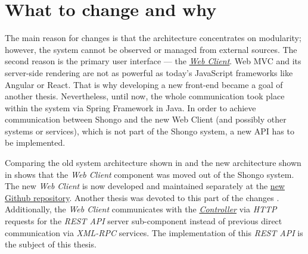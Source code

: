 \chapter{What to change and why}

The main reason for changes is that the architecture concentrates on modularity; however, the system cannot be observed or managed from external sources.
The second reason is the primary user interface --- the \hyperref[webclient]{\emph{Web Client}}. Web MVC and its server-side rendering are not as powerful as today's JavaScript frameworks like Angular or React.
That is why developing a new front-end became a goal of another thesis. \cite{drobnakm}
Nevertheless, until now, the whole communication took place within the system via Spring Framework in Java. In order to achieve communication between Shongo and the new Web Client (and possibly other systems or services), which is not part of the Shongo system, a new API has to be implemented.


Comparing the old system architecture shown in  and the new architecture shown in  shows that the \emph{Web Client} component was moved out of the Shongo system. The new \emph{Web Client} is now developed and maintained separately at the \href{https://github.com/shongo/shongo-frontend}{new Github repository}. Another thesis was devoted to this part of the changes \cite{drobnakm}.
Additionally, the \emph{Web Client} communicates with the \hyperref[controller]{\emph{Controller}} via \emph{HTTP} requests for the \emph{REST API} server sub-component instead of previous direct communication via \emph{XML-RPC} services. The implementation of this \emph{REST API} is the subject of this thesis.
